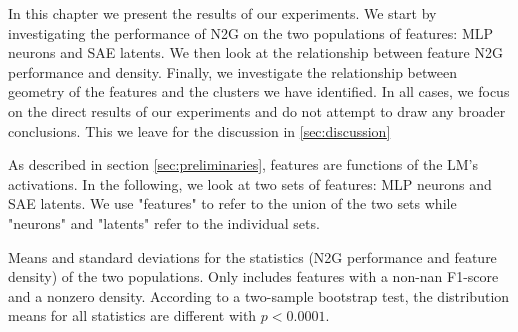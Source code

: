 In this chapter we present the results of our experiments.
We start by investigating the performance of N2G on the two populations of features: MLP neurons and SAE latents.
We then look at the relationship between feature N2G performance and density.
Finally, we investigate the relationship between geometry of the features and the clusters we have identified.
In all cases, we focus on the direct results of our experiments and do not attempt to draw any broader conclusions.
This we leave for the discussion in \autoref{sec:discussion}

As described in section \ref{sec:preliminaries}, features are functions of the LM's activations.
In the following, we look at two sets of features: MLP neurons and SAE latents.
We use "features" to refer to the union of the two sets while "neurons" and "latents" refer to the individual sets.



\begin{table}[ht]
    \centering
    
    \caption{Means and standard deviations for the statistics (N2G performance and feature density) of the two populations. Only includes features with a non-nan F1-score and a nonzero density. According to a two-sample bootstrap test, the distribution means for all statistics are different with $p<0.0001$.}
    \label{tab:distributions}
\end{table}

